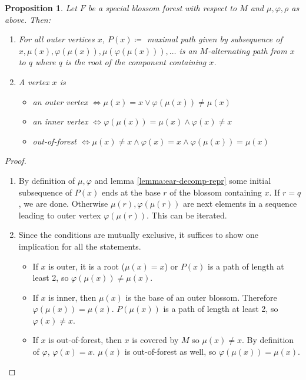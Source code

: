 \documentclass[11pt, a4paper]{article}
\newtheorem{prop}[theorem]{Proposition}
\theoremstyle{remark}
\theoremstyle{definition}
\begin{document}
\begin{prop}\label{special-blossom-forest-repr}
Let $F$ be a special blossom forest with respect to $M$ and
$\mu,\varphi,\rho$ as above. Then:
\begin{enumerate}
	\item
	For all outer vertices $x$, $P(x)\coloneqq$
	maximal path given by subsequence of
	$x,\mu(x),\varphi(\mu(x)),\mu(\varphi(\mu(x))),\ldots$
	is an $M$-alternating path from $x$ to $q$ where $q$ is the root
	of the component containing $x$.
	
	\item
	A vertex $x$ is
	\begin{itemize}
		\item
		an outer vertex $\Leftrightarrow \mu(x)=x\lor
		\varphi(\mu(x))\neq\mu(x)$
		\item
		an inner vertex $\Leftrightarrow \varphi(\mu(x))=\mu(x)
		\land \varphi(x)\neq x$
		\item
		out-of-forest $\Leftrightarrow \mu(x)\neq x \land \varphi(x)=x
		\land \varphi(\mu(x))=\mu(x)$
	\end{itemize}
\end{enumerate}
\end{prop}
\begin{proof}\ 
\begin{enumerate}
\item
By definition of $\mu,\varphi$ and lemma \ref{lemma:ear-decomp-repr}
some initial subsequence of $P(x)$ ends at the base $r$ of the blossom
containing $x$. If $r=q$, we are done. Otherwise $\mu(r),\varphi(\mu(r))$
are next elements in a sequence leading to outer vertex $\varphi(\mu(r))$.
This can be iterated.

\item
Since the conditions are mutually exclusive, it suffices to
show one implication for all the statements.
\begin{itemize}
	\item
	If $x$ is outer, it is a root ($\mu(x)=x$) or $P(x)$ is a path of length
	at least 2, so $\varphi(\mu(x))\neq\mu(x)$.

	\item
	If $x$ is inner, then $\mu(x)$ is the base of an outer blossom.
	Therefore $\varphi(\mu(x))=\mu(x)$. $P(\mu(x))$ is a path of length
	at least 2, so $\varphi(x)\neq x$.
	
	\item
	If $x$ is out-of-forest, then $x$ is covered by $M$ so $\mu(x)\neq x$.
	By definition of $\varphi$, $\varphi(x)=x$. $\mu(x)$ is out-of-forest
	as well, so $\varphi(\mu(x))=\mu(x)$.
\end{itemize}
\end{enumerate}
\end{proof}
\end{document}
